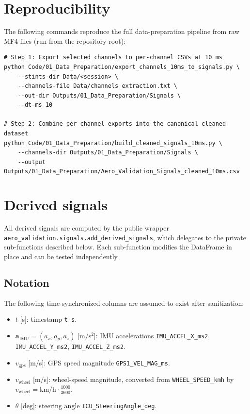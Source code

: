 \documentclass[11pt,a4paper]{article}
\begin{document}
\section{Reproducibility}
The following commands reproduce the full data-preparation pipeline from raw
MF4 files (run from the repository root):

\begin{verbatim}
# Step 1: Export selected channels to per-channel CSVs at 10 ms
python Code/01_Data_Preparation/export_channels_10ms_to_signals.py \
    --stints-dir Data/<session> \
    --channels-file Data/channels_extraction.txt \
    --out-dir Outputs/01_Data_Preparation/Signals \
    --dt-ms 10

# Step 2: Combine per-channel exports into the canonical cleaned dataset
python Code/01_Data_Preparation/build_cleaned_signals_10ms.py \
    --channels-dir Outputs/01_Data_Preparation/Signals \
    --output Outputs/01_Data_Preparation/Aero_Validation_Signals_cleaned_10ms.csv
\end{verbatim}

\section{Derived signals}
All derived signals are computed by the public wrapper
\texttt{aero\_validation.signals.add\_derived\_signals}, which delegates to the
private sub-functions described below.  Each sub-function modifies the DataFrame
in place and can be tested independently.

\subsection{Notation}
The following time-synchronized columns are assumed to exist after sanitization:
\begin{itemize}
  \item $t$ [s]: timestamp \texttt{t\_s}.
  \item $\mathbf{a}_\text{IMU} = (a_x, a_y, a_z)$ [m/s$^2$]: IMU accelerations
        \texttt{IMU\_ACCEL\_X\_ms2}, \texttt{IMU\_ACCEL\_Y\_ms2},
        \texttt{IMU\_ACCEL\_Z\_ms2}.
  \item $v_\text{gps}$ [m/s]: GPS speed magnitude \texttt{GPS1\_VEL\_MAG\_ms}.
  \item $v_\text{wheel}$ [m/s]: wheel-speed magnitude, converted from
        \texttt{WHEEL\_SPEED\_kmh} by
        $v_\text{wheel} = \text{km/h} \cdot \frac{1000}{3600}$.
  \item $\theta$ [deg]: steering angle \texttt{ICU\_SteeringAngle\_deg}.
\end{itemize}
\end{document}

